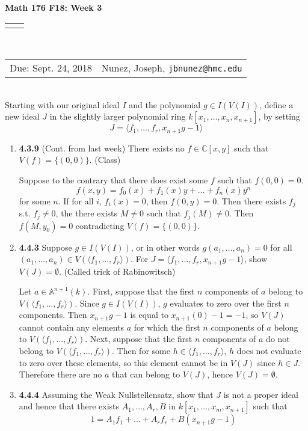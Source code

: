 \documentclass[12pt]{article}
\renewcommand{\title}[1]{\textbf{#1}\\}
\renewcommand{\line}{\begin{tabularx}{\textwidth}{X>{\raggedleft}X}\hline\\\end{tabularx}\\[-0.5cm]}
\newcommand{\leftright}[2]{\begin{tabularx}{\textwidth}{X>{\raggedleft}X}#1%
& #2\\\end{tabularx}\\[-0.5cm]}
\newcommand{\C}{\mathbb{C}}
\newcommand{\A}{\mathbb{A}}
\begin{document}
\title{Math 176 F18: Week 3}
\line
\leftright{Due: Sept. 24, 2018}{Nunez, Joseph, \texttt{jbnunez@hmc.edu}} %

Starting with our original ideal $I$ and the polynomial $g\in I(V(I))$, define a new ideal $J$ in the slightly larger polynomial ring $k[x_1,\dots,x_n,x_{n+1}]$, by setting 
\[J = \langle f_1,\dots,f_r, x_{n+1}g-1\rangle\]

\begin{enumerate}

	\item \textbf{4.3.9} (Cont. from last week) There exists no $f\in \C[x,y]$ such that $V(f)=\{(0,0)\}$.  (Class)
	
	Suppose to the contrary that there does exist some $f$ such that $f(0,0)=0$.  
	\[f(x,y) = f_0(x)+f_1(x)y+\dots+f_n(x)y^n\]
	for some $n$.  If for all $i$, $f_i(x)=0$, then $f(0,y)=0$.  Then there exists $f_j$ s.t. $f_j\neq 0$, the there exists $M\neq 0$ such that $f_j(M)\neq 0$.  Then $f(M,y_0)=0$ contradicting $V(f)=\{(0,0)\}$.
	
 
 	\item \textbf{4.4.3} Suppose $g\in I(V(I))$, or in other words $g(a_1,\dots,a_n)=0$ 
 	for all $(a_1,\dots,a_n)\in V(\langle f_1,\dots,f_r\rangle)$.  
 	For $J=\langle f_1,\dots,f_r, x_{n+1}g-1\rangle$, show $V(J)=\emptyset$. (Called trick of Rabinowitsch)
 	
 	Let $a\in \A^{n+1}(k)$.  First, suppose that the first $n$ components of $a$ belong to $V(\langle f_1,\dots,f_r\rangle)$.  Since $g\in I(V(I))$, $g$ evaluates to zero over the first $n$ components. Then $x_{n+1}g-1$ is equal to $x_{n+1}(0)-1=-1$, so $V(J)$ cannot contain any elements $a$ for which the first $n$ components of $a$ belong to $V(\langle f_1,\dots,f_r\rangle)$.  Next, suppose that the first $n$ components of $a$ do not belong to $V(\langle f_1,\dots,f_r\rangle)$.   Then for some $h\in \langle f_1,\dots,f_r\rangle$, $h$ does not evaluate to zero over these elements, so this element cannot be in $V(J)$ since $h\in J$.  Therefore there are no $a$ that can belong to $V(J)$, hence $V(J)=\emptyset$.
 	
 	\item \textbf{4.4.4} Assuming the Weak Nullstellensatz, show that $J$ is not a proper ideal and hence that there exists $A_1, \dots, A_r, B$ in $k[x_1,\dots,x_m, x_{n+1}]$ such that 
 	\[1 = A_1f_1+\dots +A_rf_r + B(x_{n+1}g-1)\]
 	

\end{enumerate}
\end{document}
